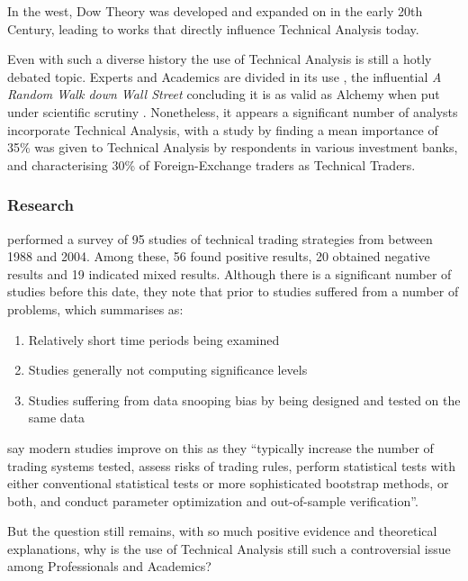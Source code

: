\documentclass{article}
\theoremstyle{definition}
\begin{document}
In the west, Dow Theory was developed and expanded on in the early 20th Century, leading to works \citep{edwards2012technical} that directly influence Technical Analysis today.

Even with such a diverse history the use of Technical Analysis is still a hotly debated topic. Experts and Academics are divided in its use \citep{foundations}, the influential \textit{A Random Walk down Wall Street} concluding it is as valid as Alchemy when put under scientific scrutiny \cite[p.159]{randomwalk2012}. Nonetheless, it appears a significant number of analysts incorporate Technical Analysis, with a study by \cite{examininguse1997} finding a mean importance of 35\% was given to Technical Analysis by respondents in various investment banks, and \cite{cheung2000currency} characterising 30\% of Foreign-Exchange traders as Technical Traders. 

\subsubsection{Research}

\cite{taprofitability} performed a survey of 95 studies of technical trading strategies from between 1988 and 2004. Among these, 56 found positive results, 20 obtained negative results and 19 indicated mixed results. Although there is a significant number of studies before this date, they note that prior to \cite{lukac1988} studies suffered from a number of problems, which \cite{brock1992} summarises as:
\begin{enumerate}
\item Relatively short time periods being examined 
\item Studies generally not computing significance levels 
\item Studies suffering from data snooping bias by being designed and tested on the same data
\end{enumerate}

\cite{taprofitability} say modern studies improve on this as they ``typically
increase the number of trading systems tested, assess risks of trading rules,
perform statistical tests with either conventional statistical tests or more sophisticated bootstrap methods, or both, and conduct parameter optimization and out-of-sample verification''.

But the question still remains, with so much positive evidence and theoretical explanations, why is the use of Technical Analysis still such a controversial issue among Professionals and Academics? 
\end{document}
